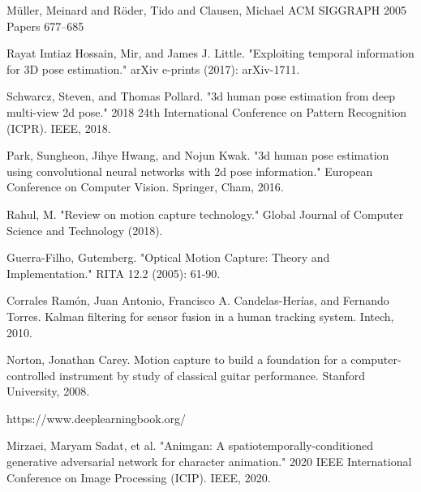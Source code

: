 \begin{thebibliography}{9}

M{\"u}ller, Meinard and R{\"o}der, Tido and Clausen, Michael ACM SIGGRAPH 2005 Papers 677--685

Rayat Imtiaz Hossain, Mir, and James J. Little. "Exploiting temporal information for 3D pose estimation." arXiv e-prints (2017): arXiv-1711.

Schwarcz, Steven, and Thomas Pollard. "3d human pose estimation from deep multi-view 2d pose." 2018 24th International Conference on Pattern Recognition (ICPR). IEEE, 2018.

Park, Sungheon, Jihye Hwang, and Nojun Kwak. "3d human pose estimation using convolutional neural networks with 2d pose information." European Conference on Computer Vision. Springer, Cham, 2016.

Rahul, M. "Review on motion capture technology." Global Journal of Computer Science and Technology (2018).

Guerra-Filho, Gutemberg. "Optical Motion Capture: Theory and Implementation." RITA 12.2 (2005): 61-90.

Corrales Ramón, Juan Antonio, Francisco A. Candelas-Herías, and Fernando Torres. Kalman filtering for sensor fusion in a human tracking system. Intech, 2010.

 Norton, Jonathan Carey. Motion capture to build a foundation for a computer-controlled instrument by study of classical guitar performance. Stanford University, 2008.
 
https://www.deeplearningbook.org/

Mirzaei, Maryam Sadat, et al. "Animgan: A spatiotemporally-conditioned generative adversarial network for character animation." 2020 IEEE International Conference on Image Processing (ICIP). IEEE, 2020.


\end{thebibliography}
